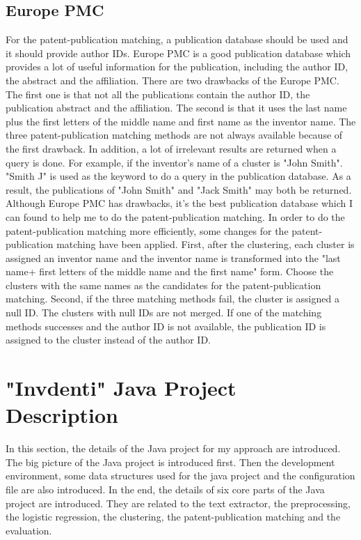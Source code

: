 \subsection{Europe PMC}
For the patent-publication matching, a publication database should be used and it should provide author IDs. Europe PMC is a good publication database which provides a lot of useful information for the publication, including the author ID, the abstract and the affiliation. There are two drawbacks of the Europe PMC. The first one is that not all the publications contain the author ID, the publication abstract and the affiliation. The second  is that it uses the last name plus the first letters of the middle name and first name as the inventor name. The three patent-publication matching methods are not always available  because of the first drawback. In addition, a lot of irrelevant results are returned when a query is done. For example, if the inventor's name of a cluster is "John Smith". "Smith J"  is used as the keyword to do a query in the publication database. As a result, the publications of  "John Smith" and "Jack Smith" may both be returned. Although Europe PMC has drawbacks, it's the best publication database which I can found to help me to do the patent-publication matching. In order to do the patent-publication matching more efficiently, some changes for the patent-publication matching have been applied. First, after the clustering, each cluster is assigned an inventor name and the inventor name is transformed into the "last name+ first letters of the middle name and the first name" form. Choose the clusters with the same names as the candidates for the patent-publication matching. Second, if the three matching methods fail, the cluster is assigned a null ID. The clusters with  null IDs are not merged. If one of the matching methods successes and the author ID is not available, the publication ID is assigned to the cluster instead of the author ID.  

\section{"Invdenti" Java Project Description}
In this section, the details of the Java project for my approach are introduced. The big picture of the Java project is introduced first. Then the development environment, some data structures used for the java project and the configuration file are also introduced. In the end, the details of six core parts of the Java project are introduced. They are related to the text extractor, the preprocessing, the logistic regression, the clustering, the patent-publication matching and the evaluation.


